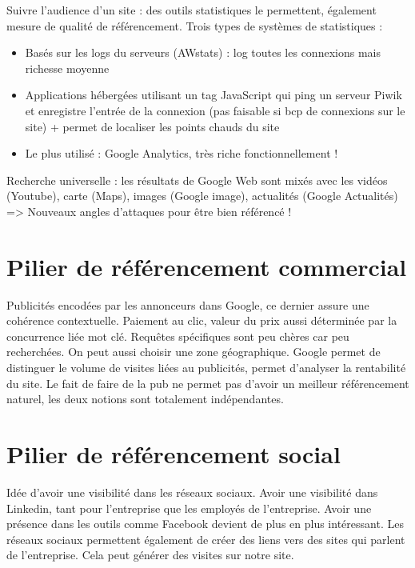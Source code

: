 \documentclass[10pt,a4paper]{article}
\begin{document}
Suivre l'audience d'un site : des outils statistiques le permettent, également mesure de qualité de référencement.
Trois types de systèmes de statistiques :
\begin{itemize}
\item Basés sur les logs du serveurs (AWstats) : log toutes les connexions mais richesse moyenne
\item Applications hébergées utilisant un tag JavaScript qui ping un serveur Piwik et enregistre l'entrée de la connexion (pas faisable si bcp de connexions sur le site) + permet de localiser les points chauds du site
\item Le plus utilisé : Google Analytics, très riche fonctionnellement !
\end{itemize}

Recherche universelle : les résultats de Google Web sont mixés avec les vidéos (Youtube), carte (Maps), images (Google image), actualités (Google Actualités) => Nouveaux angles d'attaques pour être bien référencé ! 

\section{Pilier de référencement commercial}
Publicités encodées par les annonceurs dans Google, ce dernier assure une cohérence contextuelle. 
Paiement au clic, valeur du prix aussi déterminée par la concurrence liée mot clé. 
Requêtes spécifiques sont peu chères car peu recherchées.
On peut aussi choisir une zone géographique. Google permet de distinguer le volume de visites liées au publicités, permet d'analyser la rentabilité du site.
Le fait de faire de la pub ne permet pas d'avoir un meilleur référencement naturel, les deux notions sont totalement indépendantes. 

\section{Pilier de référencement social}
Idée d'avoir une visibilité dans les réseaux sociaux. Avoir une visibilité dans Linkedin, tant pour l'entreprise que les employés de l'entreprise. Avoir une présence dans les outils comme Facebook devient de plus en plus intéressant. Les réseaux sociaux permettent également de créer des liens vers des sites qui parlent de l'entreprise. Cela peut générer des visites sur notre site. 
\end{document}

